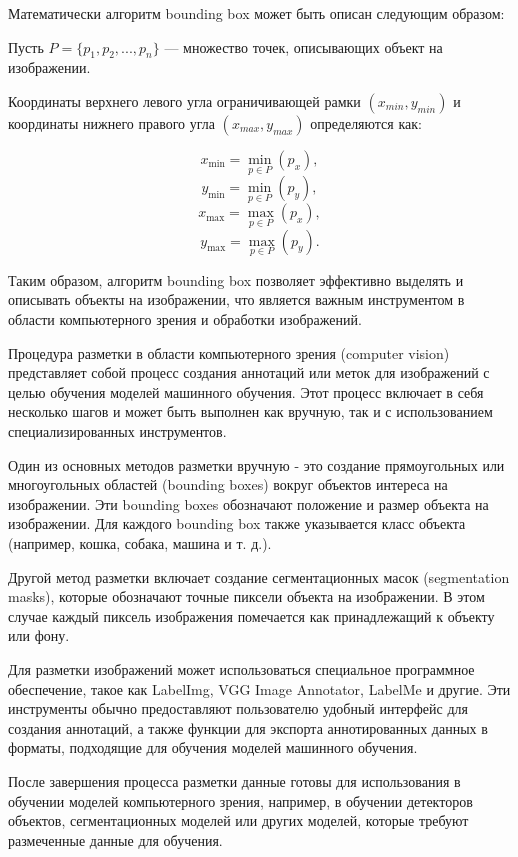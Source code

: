 Математически алгоритм bounding box может быть описан следующим образом:

Пусть \( P = \{p_1, p_2, ..., p_n\} \) — множество точек, описывающих объект на изображении.

Координаты верхнего левого угла ограничивающей рамки $(x_{min}, y_{min})$ и координаты нижнего правого угла $(x_{max}, y_{max})$ определяются как:

\[ x_{\text{min}} = \min_{p \in P} (p_x), \]
\[ y_{\text{min}} = \min_{p \in P} (p_y), \]
\[ x_{\text{max}} = \max_{p \in P} (p_x), \]
\[ y_{\text{max}} = \max_{p \in P} (p_y). \]

Таким образом, алгоритм bounding box позволяет эффективно выделять и описывать объекты на изображении, что является важным инструментом в области компьютерного зрения и обработки изображений.


Процедура разметки в области компьютерного зрения (computer vision) представляет собой процесс создания аннотаций или меток для изображений с целью обучения моделей машинного обучения. Этот процесс включает в себя несколько шагов и может быть выполнен как вручную, так и с использованием специализированных инструментов.

Один из основных методов разметки вручную - это создание прямоугольных или многоугольных областей (bounding boxes) вокруг объектов интереса на изображении. Эти bounding boxes обозначают положение и размер объекта на изображении. Для каждого bounding box также указывается класс объекта (например, кошка, собака, машина и т. д.).

Другой метод разметки включает создание сегментационных масок (segmentation masks), которые обозначают точные пиксели объекта на изображении. В этом случае каждый пиксель изображения помечается как принадлежащий к объекту или фону.

Для разметки изображений может использоваться специальное программное обеспечение, такое как LabelImg, VGG Image Annotator, LabelMe и другие. Эти инструменты обычно предоставляют пользователю удобный интерфейс для создания аннотаций, а также функции для экспорта аннотированных данных в форматы, подходящие для обучения моделей машинного обучения.

После завершения процесса разметки данные готовы для использования в обучении моделей компьютерного зрения, например, в обучении детекторов объектов, сегментационных моделей или других моделей, которые требуют размеченные данные для обучения.
